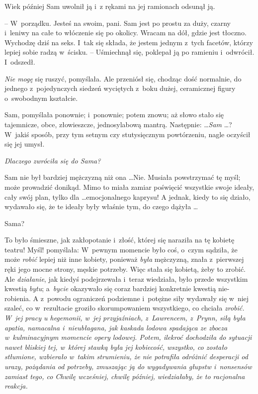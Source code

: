 \documentclass[oneside,polish,11pt,rmheadings]{mwbk}
\begin{document}
Wiek później Sam uwolnił ją i~z rękami na jej ramionach odsunął ją. 

-- W~porządku. Jesteś na swoim, pani. Sam jest po prostu za duży, czarny i~leniwy na całe to włóczenie się po okolicy. Wracam na dół, gdzie jest tłoczno. Wychodzę dziś na seks. I~tak się składa, że jestem jednym z~tych facetów, którzy lepiej sobie radzą w~ścisku. -- Uśmiechnął się, poklepał ją po ramieniu i~odwrócił. I~odszedł. 

\textit{Nie mogę }się ruszyć, pomyślała. Ale przeniósł się, chodząc dość normalnie, do jednego z~pojedynczych siedzeń wyciętych z~boku dużej, ceramicznej figury o~swobodnym kształcie. 

Sam, pomyślała ponownie; i~ponownie; potem znowu; aż słowo stało się tajemnicze, obce, złowieszcze, jednosylabową mantrą. Następnie:  \ldots  \textit{Sam } \ldots ? W~jakiś sposób, przy tym setnym czy stutysięcznym powtórzeniu, nagle oczyścił się jej umysł. 

\textit{Dlaczego zwróciła się do Sama?} 

Sam nie był bardziej mężczyzną niż ona \ldots  Nie. Musiała powstrzymać tę myśl; może prowadzić donikąd. Mimo to miała zamiar poświęcić wszystkie swoje ideały, cały swój plan, tylko dla \ldots  emocjonalnego kaprysu! A jednak, kiedy to się działo, wydawało się, że te ideały były właśnie tym, do czego dążyła \ldots  

Sama? 

To było śmieszne, jak zakłopotanie i~złość, której się naraziła na tę kobietę teatru! Myśl! pomyślała: W~pewnym momencie było coś, o~czym sądziła, że może \textit{robić }lepiej niż inne kobiety,  ponieważ \textit{była }mężczyzną, znała z~pierwszej ręki jego mocne strony, męskie potrzeby. Więc stała się kobietą, żeby to zrobić. Ale \textit{działanie}, jak kiedyś podejrzewała i~teraz wiedziała, było przede wszystkim kwestią \textit{bytu}; a~\textit{bycie }okazywało się coraz bardziej konkretnie kwestią nie-robienia. A z~powodu ograniczeń podziemne i~potężne siły wydawały się w~niej szaleć, co w~rezultacie groziło skorumpowaniem wszystkiego, co chciała \textit{zrobić. W~jej pracy u hegemonii, w~jej przyjaźniach, z~Lawrencem, z~Prynn, siłą była apatia, namacalna i~nieubłagana, jak kaskada lodowa spadająca ze zbocza w~kulminacyjnym momencie opery lodowej. Potem, ilekroć dochodziła do sytuacji nawet bliskiej tej, w~której stawką była jej kobiecość, wszystko, co zostało stłumione, wzbierało w~takim strumieniu, że nie potrafiła odróżnić desperacji od urazy, pożądania od potrzeby, zmuszając ją do wygadywania głupstw i~nonsensów zamiast tego, co Chwilę wcześniej, chwilę później, wiedziałaby, że to racjonalna reakcja.} 
\end{document}
